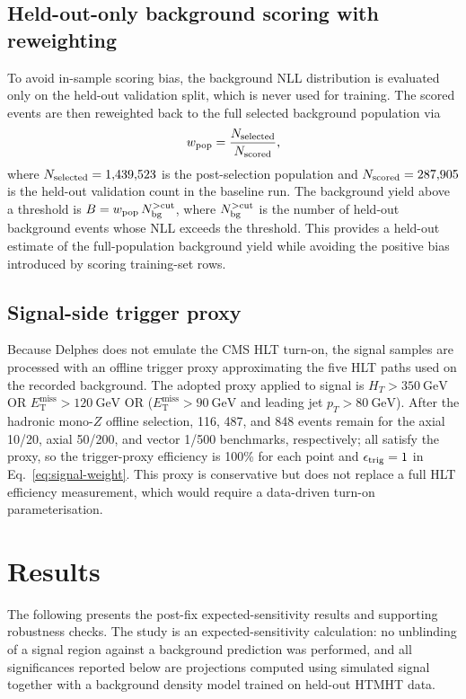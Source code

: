 \documentclass[11pt,a4paper,twocolumn]{article}
\newcommand{\GeV}{\text{GeV}}
\newcommand{\MET}{\ensuremath{E_{\mathrm{T}}^{\mathrm{miss}}}}
\begin{document}
\subsection{Held-out-only background scoring with reweighting}

To avoid in-sample scoring bias, the background NLL distribution is
evaluated only on the held-out validation split, which is never used for
training. The scored events are then reweighted back to the full selected
background population via
\begin{equation}
  w_{\rm pop} = \frac{N_{\rm selected}}{N_{\rm scored}},
  \label{eq:pop-weight}
\end{equation}
where $N_{\rm selected}=1{,}439{,}523$ is the post-selection population and
$N_{\rm scored}=287{,}905$ is the held-out validation count in the baseline
run. The background yield above a threshold is
$B = w_{\rm pop}\, N_{\rm bg}^{>\mathrm{cut}}$, where
$N_{\rm bg}^{>\mathrm{cut}}$ is the number of held-out background events
whose NLL exceeds the threshold. This provides a held-out estimate of the
full-population background yield while avoiding the positive bias introduced
by scoring training-set rows.

\subsection{Signal-side trigger proxy}
\label{sec:trigger-proxy}

Because Delphes does not emulate the CMS HLT turn-on, the signal samples
are processed with an offline trigger proxy approximating the five HLT
paths used on the recorded background. The adopted proxy applied to signal
is $H_T>350~\GeV$ OR $\MET>120~\GeV$ OR ($\MET>90~\GeV$ and leading jet
$p_T>80~\GeV$). After the hadronic mono-$Z$ offline selection, 116, 487, and
848 events remain for the axial 10/20, axial 50/200, and vector 1/500
benchmarks, respectively; all satisfy the proxy, so the trigger-proxy
efficiency is 100\% for each point and $\epsilon_{\rm trig}=1$ in
Eq.~\eqref{eq:signal-weight}. This proxy is conservative but does not
replace a full HLT efficiency measurement, which would require a data-driven
turn-on parameterisation.


\section{Results}
\label{sec:results}

The following presents the post-fix expected-sensitivity results and
supporting robustness checks. The study is an expected-sensitivity
calculation: no unblinding of a signal region against a background
prediction was performed, and all significances reported below are projections
computed using simulated signal together with a background density model
trained on held-out HTMHT data.
\end{document}
